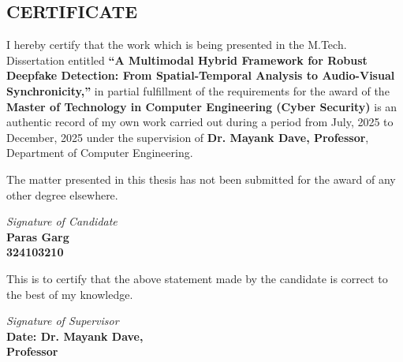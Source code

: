 \begin{center}
	\section*{CERTIFICATE}
	\noindent{\rule{\textwidth}{1.5pt}}
\end{center}
I hereby certify that the work which is being presented in the M.Tech. Dissertation entitled \textbf{``A Multimodal Hybrid Framework for Robust Deepfake Detection: From Spatial-Temporal Analysis to Audio-Visual Synchronicity,''} in partial fulfillment of the requirements for the award of the \textbf{Master of Technology in Computer Engineering (Cyber Security)} is an authentic record of my own work carried out during a period from July, 2025 to December, 2025 under the supervision of \textbf{Dr. Mayank Dave, Professor}, Department of Computer Engineering.
\vspace{30pt}
\par
The matter presented in this thesis has not been submitted for the award of any other degree elsewhere.
\begin{flushright}
	\textit{Signature of Candidate \\}
	\textbf{Paras Garg\\324103210\\}
\end{flushright}
\vspace{30pt}

\par
This is to certify that the above statement made by the candidate is correct to the best of my knowledge.
\vspace{20pt}

\begin{flushright}
	\textit{Signature of Supervisor\\}
	\textbf{Date: \hfill Dr. Mayank Dave,\\ Professor}
\end{flushright}
